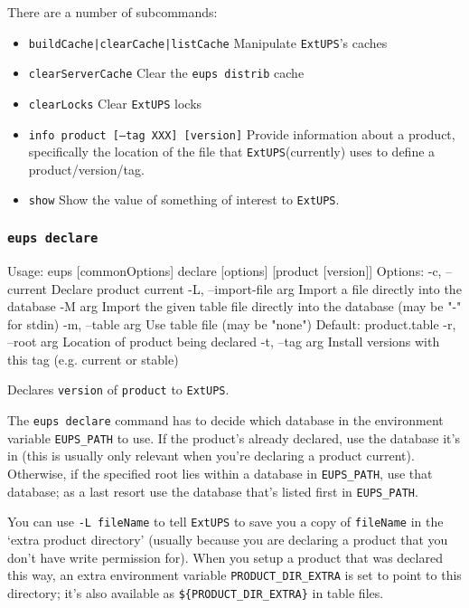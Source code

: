 \documentclass{article}
\newcommand{\code}[1]{\texttt{#1}}
\newcommand{\eups}{\code{ExtUPS}\xspace}
\let\overbatim=\verbatim
\let\oendverbatim=\endverbatim
\renewenvironment{verbatim}
{\center\minipage{16cm}\overbatim}
{\oendverbatim\endminipage\endcenter}
\begin{document}
There are a number of subcommands:
\begin{itemize}
  \item{\code{buildCache|clearCache|listCache}}
    Manipulate \eups's caches

  \item{\code{clearServerCache}}
    Clear the \code{eups distrib} cache

  \item{\code{clearLocks}}
    Clear \eups locks

  \item{\code{info product [--tag XXX] [version]}}
    Provide information about a product, specifically the location of the file that \eups (currently)
    uses to define a product/version/tag.

  \item{\code{show}}
    Show the value of something of interest to \eups.
\end{itemize}

\subsubsection{\code{eups declare}}
\label{eups declare}
\begin{verbatim}
Usage:
   eups [commonOptions] declare [options] [product [version]]
Options:
   -c, --current           Declare product current
   -L, --import-file arg   Import a file directly into the database
   -M               arg    Import the given table file directly into the database
                           (may be "-" for stdin)
   -m, --table      arg    Use table file (may be "none") Default: product.table
   -r, --root       arg    Location of product being declared
   -t, --tag        arg    Install versions with this tag (e.g. current or stable)
\end{verbatim}

Declares \code{version} of \code{product} to \eups.

The \code{eups declare} command has to decide which database in the environment
variable \code{EUPS\_PATH}
to use.  If the product's already declared, use the database it's in (this is usually
only relevant when you're declaring a product current).  Otherwise, if the specified root
lies within a database in \code{EUPS\_PATH}, use that database; as a last resort use
the database that's listed first in \code{EUPS\_PATH}.

You can use \code{-L fileName} to tell \eups to save you a copy of \code{fileName} in the
`extra product directory'
(usually because you are declaring a product that you don't have write permission for).
When you setup a product that was declared
this way, an extra environment variable \code{PRODUCT\_DIR\_EXTRA} is set to point to this directory;
it's also available as \code{\$\{PRODUCT\_DIR\_EXTRA\}} in table files.
\end{document}
